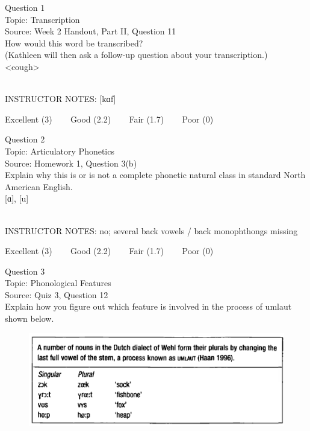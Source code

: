 \documentclass[12pt]{article}
\begin{document}
{\large Question 1}\\

Topic: Transcription\\
Source: Week 2 Handout, Part II, Question 11\\

How would this word be transcribed?\\ (Kathleen will then ask a follow-up question about your transcription.)\\

<cough>


~\\
INSTRUCTOR NOTES: [kɑf]


\vfill
Excellent (3) ~~~ Good (2.2) ~~~ Fair (1.7) ~~~ Poor (0)
\newpage

{\large Question 2}\\

Topic: Articulatory Phonetics\\
Source: Homework 1, Question 3(b)\\

Explain why this is or is not a complete phonetic natural class in standard North American English.\\

{[ɑ]}, {[u]}


~\\
INSTRUCTOR NOTES: no; several back vowels / back monophthongs missing


\vfill
Excellent (3) ~~~ Good (2.2) ~~~ Fair (1.7) ~~~ Poor (0)
\newpage

{\large Question 3}\\

Topic: Phonological Features\\
Source: Quiz 3, Question 12\\

Explain how you figure out which feature is involved in the process of umlaut shown below.\\

\begin{figure}[H]
\includegraphics{../images/dutch.png}
\end{figure}
\end{document}
